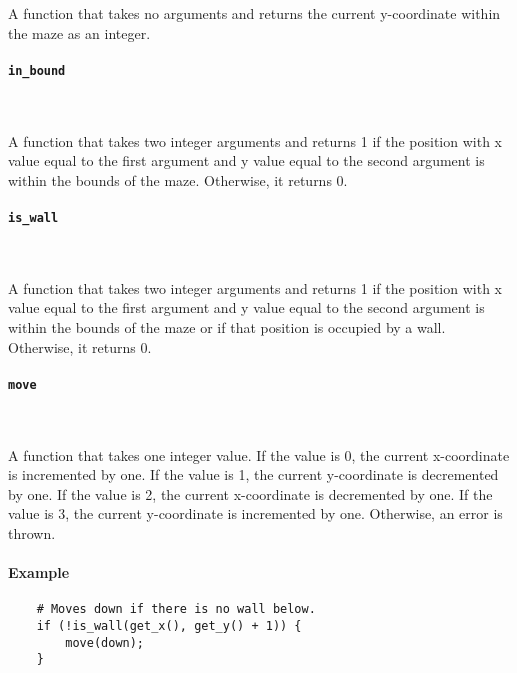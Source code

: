 A function that takes no arguments and returns the current y-coordinate within the maze as an integer.

\paragraph{\texttt{in\_bound}} \

A function that takes two integer arguments and returns 1 if the position with x value equal to the first argument and y value equal to the second argument is within the bounds of the maze. Otherwise, it returns 0.

\paragraph{\texttt{is\_wall}} \

A function that takes two integer arguments and returns 1 if the position with x value equal to the first argument and y value equal to the second argument is within the bounds of the maze or if that position is occupied by a wall. Otherwise, it returns 0.

\paragraph{\texttt{move}} \

A function that takes one integer value. If the value is 0, the current x-coordinate is incremented by one. If the value is 1, the current y-coordinate is decremented by one. If the value is 2, the current x-coordinate is decremented by one. If the value is 3, the current y-coordinate is incremented by one. Otherwise, an error is thrown.

\paragraph{Example}

\begin{verbatim}
    # Moves down if there is no wall below.
    if (!is_wall(get_x(), get_y() + 1)) {
        move(down);
    }
\end{verbatim}
